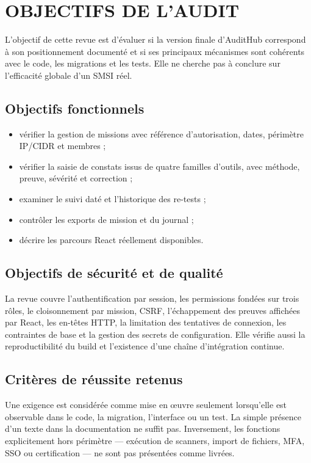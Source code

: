 \chapter{OBJECTIFS DE L'AUDIT}

L'objectif de cette revue est d'\'evaluer si la version finale d'AuditHub correspond \`a son positionnement document\'e et si ses principaux m\'ecanismes sont coh\'erents avec le code, les migrations et les tests. Elle ne cherche pas \`a conclure sur l'efficacit\'e globale d'un SMSI r\'eel.

\section*{Objectifs fonctionnels}
\begin{itemize}
  \item v\'erifier la gestion de missions avec r\'ef\'erence d'autorisation, dates, p\'erim\`etre IP/CIDR et membres ;
  \item v\'erifier la saisie de constats issus de quatre familles d'outils, avec m\'ethode, preuve, s\'ev\'erit\'e et correction ;
  \item examiner le suivi dat\'e et l'historique des re-tests ;
  \item contr\^oler les exports de mission et du journal ;
  \item d\'ecrire les parcours React r\'eellement disponibles.
\end{itemize}

\section*{Objectifs de s\'ecurit\'e et de qualit\'e}
La revue couvre l'authentification par session, les permissions fond\'ees sur trois r\^oles, le cloisonnement par mission, CSRF, l'\'echappement des preuves affich\'ees par React, les en-t\^etes HTTP, la limitation des tentatives de connexion, les contraintes de base et la gestion des secrets de configuration. Elle v\'erifie aussi la reproductibilit\'e du build et l'existence d'une cha\^ine d'int\'egration continue.

\section*{Crit\`eres de r\'eussite retenus}
Une exigence est consid\'er\'ee comme mise en \oe uvre seulement lorsqu'elle est observable dans le code, la migration, l'interface ou un test. La simple pr\'esence d'un texte dans la documentation ne suffit pas. Inversement, les fonctions explicitement hors p\'erim\`etre --- ex\'ecution de scanners, import de fichiers, MFA, SSO ou certification --- ne sont pas pr\'esent\'ees comme livr\'ees.

